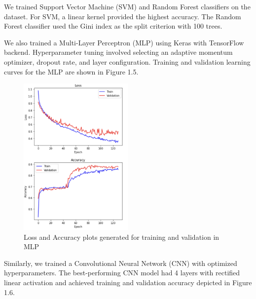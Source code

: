 We trained Support Vector Machine (SVM) and Random Forest classifiers on the dataset. For SVM, a linear kernel provided the highest accuracy. The Random Forest classifier used the Gini index as the split criterion with 100 trees.

We also trained a Multi-Layer Perceptron (MLP) using Keras with TensorFlow backend. Hyperparameter tuning involved selecting an adaptive momentum optimizer, dropout rate, and layer configuration. Training and validation learning curves for the MLP are shown in Figure 1.5.

\begin{figure}[H]
    \centering
    \includegraphics[width=0.5\textwidth]{Images/loss-accuracy-mlp.png}
    \caption{Loss and Accuracy plots generated for training and validation in MLP}
\end{figure}

Similarly, we trained a Convolutional Neural Network (CNN) with optimized hyperparameters. The best-performing CNN model had 4 layers with rectified linear activation and achieved training and validation accuracy depicted in Figure 1.6.
